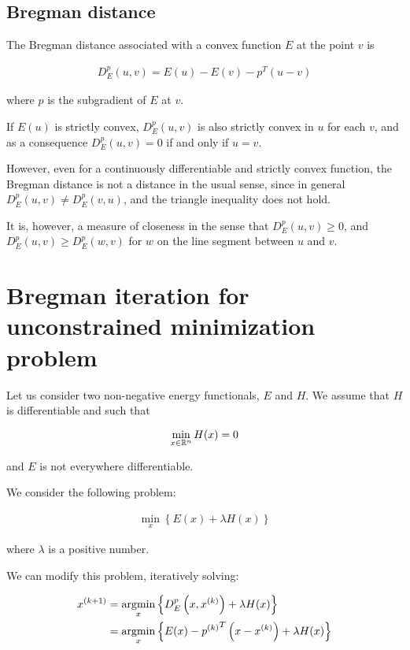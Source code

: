 \subsection{Bregman distance}

\begin{defi}
The Bregman distance \citep{reg_tv} associated with a convex function $E$ at the point $v$ is

\begin{align}
D^p_E (u,v) = E(u) - E(v) - p^T(u-v)
\end{align}

where $p$ is the subgradient of $E$ at $v$.
\end{defi}

If $E(u)$ is strictly convex, $D^p_E(u,v)$ is also strictly convex in $u$ for each $v$, and as a consequence $D^p_E(u,v)=0$ if and only if $u=v$.

However, even for a continuously differentiable and strictly convex function, the Bregman distance is not a distance in the usual sense, since in general $D^p_E(u,v) \neq D^p_E(v,u)$, and the triangle inequality does not hold.

It is, however, a measure of closeness in the sense that $D^p_E(u,v) \geq 0$, and $D^p_E(u,v) \geq D^p_E(w,v)$ for $w$ on the line segment between $u$ and $v$.

\section{Bregman iteration for unconstrained minimization problem}

Let us consider two non-negative energy functionals, $E$ and $H$. We assume that $H$ is differentiable and such that

$$\min_{x \in \mathbb{R}^n} H(x) = 0$$

and $E$ is not everywhere differentiable.

We consider the following problem:

\begin{align} \label{minimized_problem}
\min_x \left\{ E(x) + \lambda H(x) \right\}
\end{align}

where $\lambda$ is a positive number.

We can modify this problem, iteratively solving:

\begin{align} \label{breg_iter}
\begin{aligned}
 x^{(k+1)} &= \mathop{\mathrm{argmin}}\limits_x \left\{ D^p_E \left(x,x^{(k)}\right) + \lambda H(x) \right\} \\
 &= \mathop{\mathrm{argmin}}\limits_x \left\{ E(x) - {p^{(k)}}^T \left(x-x^{(k)}\right) + \lambda H(x) \right\}
 \end{aligned}
 \end{align}

